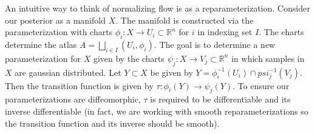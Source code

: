 An intuitive way to think of normalizing flow is as a reparameterization. Consider our posterior as a manifold $X$. The manifold is constructed via the parameterization with charts $\phi_i:X\rightarrow U_i \subset \mathbb{R}^n$ for $i$ in indexing set $I$. 
The charts determine the atlas $A = \bigsqcup\limits_{i\in I} (U_i,\phi_i)$. 
The goal is to determine a new parameterization for $X$ given by the charts $\psi_j:X\rightarrow V_j \subset \mathbb{R}^n$ in which samples in $X$ are gaussian distributed. 
Let $Y \subset X$ be given by $Y = \phi_i^{-1}(U_i) \cap psi_j^{-1}(V_j)$. 
Then the transition function is given by $\tau:\phi_i(Y)\rightarrow\psi_j(Y)$. 
To ensure our parameterizations are diffeomorphic, $\tau$ is required to be differentiable and its inverse differentiable 
(in fact, we are working with smooth reparameterizations so the transition function and its inverse should be smooth).

